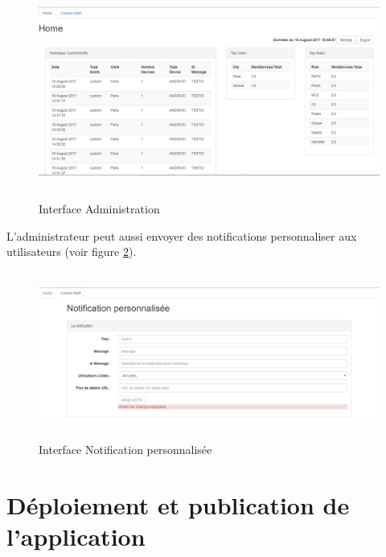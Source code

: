 \begin{figure}[!h]
	\begin{center}
		\includegraphics[height=7cm]{figures/admin}
	\end{center}
	\caption{Interface Administration}
	\label{fig4.12}
\end{figure}

L'administrateur peut aussi envoyer des notifications personnaliser aux utilisateurs (voir figure \ref{fig4.13}).

\begin{figure}[!h]
	\begin{center}
		\includegraphics[height=5.5cm]{figures/notif}
	\end{center}
	\caption{Interface Notification personnalisée}
	\label{fig4.13}
\end{figure}

\section{Déploiement et publication de l'application}

